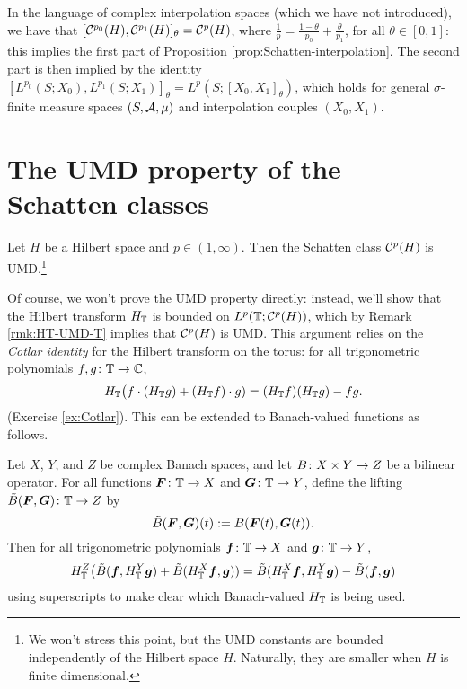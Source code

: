 \begin{rmk}  In the language of complex interpolation spaces (which we have not introduced), we have that $[\mathcal{C}^{p_0}(H), \mathcal{C}^{p_1}(H)]_{\theta} = \mathcal{C}^{p}(H)$, where $\frac{1}{p} = \frac{1-\theta}{p_0} + \frac{\theta}{p_1}$, for all $\theta \in [0,1]$: this implies the first part of Proposition \ref{prop:Schatten-interpolation}.
  The second part is then implied by the identity $[L^{p_0}(S;X_{0}), L^{p_1}(S; X_{1})]_{\theta} = L^{p}(S;[X_0,X_1]_{\theta})$, which holds for general $\sigma$-finite measure spaces $(S,\mathcal{A},\mu)$ and interpolation couples $(X_0,X_1)$.
\end{rmk}

\section{The UMD property of the Schatten classes}

\begin{thm}\label{thm:Schatten-UMD}
  Let $H$ be a Hilbert space and $p \in (1,\infty)$.
  Then the Schatten class $\mathcal{C}^{p}(H)$ is UMD.\footnote{We won't stress this point, but the UMD constants are bounded independently of the Hilbert space $H$.
  Naturally, they are smaller when $H$ is finite dimensional.}
\end{thm}

Of course, we won't prove the UMD property directly: instead, we'll show that the Hilbert transform $H_{\mathbb{T}}$ is bounded on $L^p(\mathbb{T}; \mathcal{C}^{p}(H))$, which by Remark \ref{rmk:HT-UMD-T} implies that $\mathcal{C}^{p}(H)$ is UMD.
This argument relies on the \emph{Cotlar identity} for the Hilbert transform on the torus: for all trigonometric polynomials $f,g \colon \mathbb{T} \rightarrow \mathbb{C}$,
\begin{equation}\label{eq:Cotlar}
  H_{\mathbb{T}}\big(f \cdot (H_{\mathbb{T}} g) + (H_{\mathbb{T}} f) \cdot g) = (H_{\mathbb{T}} f)(H_{\mathbb{T}} g) - fg.
\end{equation}
(Exercise \ref{ex:Cotlar}).
This can be extended to Banach-valued functions as follows.
\begin{lem}
  Let $X$, $Y$, and $Z$ be complex Banach spaces, and let $B \colon X \times Y \rightarrow Z$ be a bilinear operator.
  For all functions $\bm{F} \colon \mathbb{T} \to X$ and $\bm{G} \colon \mathbb{T} \to Y$, define the lifting $\tilde{B}(\bm{F},\bm{G}) \colon \mathbb{T} \rightarrow Z$ by
  \begin{equation*}
    \tilde{B}(\bm{F},\bm{G})(t) := B(\bm{F}(t), \bm{G}(t)).
  \end{equation*}
  Then for all trigonometric polynomials $\bm{f} \colon \mathbb{T} \rightarrow X$ and $\bm{g} \colon \mathbb{T} \rightarrow Y$,
  \begin{equation*}
    H_{\mathbb{T}}^{Z}\big(\tilde{B}(\bm{f}, H_{\mathbb{T}}^{Y} \bm{g}) + \tilde{B}(H_{\mathbb{T}}^{X} \bm{f}, \bm{g})) = \tilde{B}(H_{\mathbb{T}}^{X} \bm{f}, H_{\mathbb{T}}^{Y} \bm{g}) - \tilde{B}(\bm{f}, \bm{g})
  \end{equation*}
  using superscripts to make clear which Banach-valued $H_{\mathbb{T}}$ is being used.
\end{lem}

